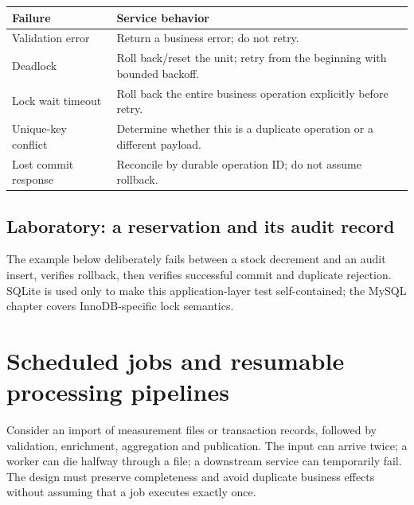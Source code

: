 \begin{longtable}{L{.30\linewidth}L{.62\linewidth}}
\toprule Failure & Service behavior \\ \midrule\endhead
Validation error & Return a business error; do not retry. \\
Deadlock & Roll back/reset the unit; retry from the beginning with bounded backoff. \\
Lock wait timeout & Roll back the entire business operation explicitly before retry. \\
Unique-key conflict & Determine whether this is a duplicate operation or a different payload. \\
Lost commit response & Reconcile by durable operation ID; do not assume rollback. \\
\bottomrule
\end{longtable}

\section{Laboratory: a reservation and its audit record}
The example below deliberately fails between a stock decrement and an audit
insert, verifies rollback, then verifies successful commit and duplicate
rejection. SQLite is used only to make this application-layer test
self-contained; the MySQL chapter covers InnoDB-specific lock semantics.


\chapter{Scheduled jobs and resumable processing pipelines}
\label{ch:enterprise-pipelines}
Consider an import of measurement files or transaction records, followed by
validation, enrichment, aggregation and publication. The input can arrive
twice; a worker can die halfway through a file; a downstream service can
temporarily fail. The design must preserve completeness and avoid duplicate
business effects without assuming that a job executes exactly once.

